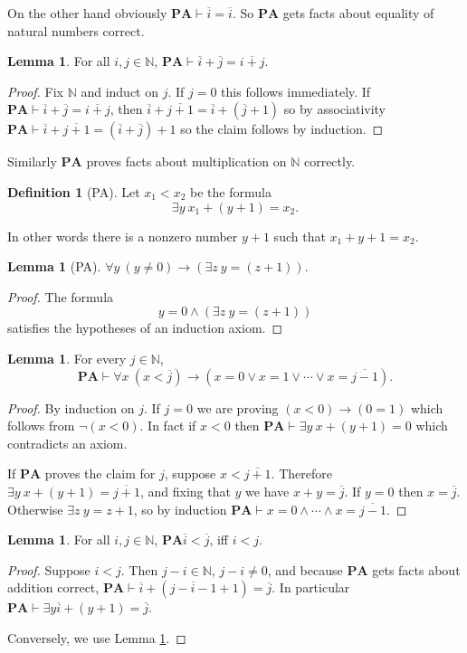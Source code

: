 \documentclass[12pt]{report}
\newcommand{\NN}{\mathbb{N}}
\newcommand{\PA}{\mathbf{PA}}
\newcommand{\proves}{\vdash}
\theoremstyle{definition}
\newtheorem{lemma}[theorem]{Lemma}
\newtheorem{definition}[theorem]{Definition}
\begin{document}
On the other hand obviously $\PA \proves \overline i = \overline i$. So $\PA$ gets facts about equality of natural numbers correct.
\begin{lemma}
For all $i, j \in \NN$, $\PA \proves \overline i + \overline j = \overline{i+j}$.
\end{lemma}
\begin{proof}
Fix $\NN$ and induct on $j$. If $j = 0$ this follows immediately.
If $\PA \proves \overline i + \overline j = \overline{i+j}$, then $\overline i + \overline{j+1} = \overline i + (\overline j + 1)$ so by associativity $\PA \proves \overline i + \overline{j+1} = (\overline i + \overline j) + 1$ so the claim follows by induction.
\end{proof}
Similarly $\PA$ proves facts about multiplication on $\NN$ correctly.
\begin{definition}[PA]
Let $x_1 < x_2$ be the formula
$$\exists y ~x_1 + (y+1) = x_2.$$
\end{definition}
In other words there is a nonzero number $y + 1$ such that $x_1 + y + 1 = x_2$.
\begin{lemma}[PA]
$\forall y ~(y \neq 0) \to (\exists z ~y = (z+1))$.
\end{lemma}
\begin{proof}
The formula
$$y = 0 \wedge (\exists z ~y = (z+1))$$
satisfies the hypotheses of an induction axiom.
\end{proof}
\begin{lemma}
\label{initial segments in PA}
For every $j \in \NN$,
$$\PA \proves \forall x ~(x < \overline j) \to (x = 0 \vee x = 1 \vee \cdots \vee x = \overline{j-1}).$$
\end{lemma}
\begin{proof}
By induction on $j$. If $j = 0$ we are proving $(x < 0) \to (0 = 1)$ which follows from $\neg(x < 0)$. In fact if $x < 0$ then $\PA \proves \exists y ~x + (y + 1) = 0$ which contradicts an axiom.

If $\PA$ proves the claim for $j$, suppose $x < \overline{j+1}$.
Therefore $\exists y~x+(y+1) = \overline{j+1}$, and fixing that $y$ we have $x + y = \overline j$. If $y = 0$ then $x = \overline j$.
Otherwise $\exists z ~y = z + 1$, so by induction $\PA \proves x = 0 \wedge \cdots \wedge x = \overline{j-1}$.
\end{proof}
\begin{lemma}
For all $i, j \in \NN$, $\PA \overline i < \overline j$, iff $i < j$.
\end{lemma}
\begin{proof}
Suppose $i < j$. Then $j - i \in \NN$, $j - i \neq 0$, and because $\PA$ gets facts about addition correct, $\PA \proves \overline i + (\overline{j-i-1} + 1) = \overline j$.
In particular $\PA \proves \exists y \overline i + (y + 1) = \overline j$.

Conversely, we use Lemma \ref{initial segments in PA}.
\end{proof}
\end{document}
